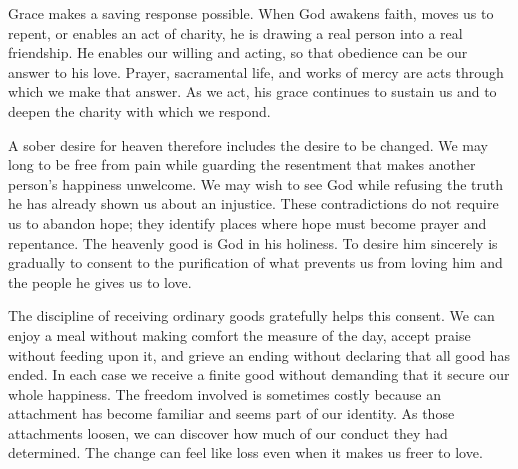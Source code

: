 Grace makes a saving response possible. When God awakens faith, moves us to repent, or enables an act of charity, he is drawing a real person into a real friendship. He enables our willing and acting, so that obedience can be our answer to his love. Prayer, sacramental life, and works of mercy are acts through which we make that answer. As we act, his grace continues to sustain us and to deepen the charity with which we respond.

A sober desire for heaven therefore includes the desire to be changed. We may long to be free from pain while guarding the resentment that makes another person's happiness unwelcome. We may wish to see God while refusing the truth he has already shown us about an injustice. These contradictions do not require us to abandon hope; they identify places where hope must become prayer and repentance. The heavenly good is God in his holiness. To desire him sincerely is gradually to consent to the purification of what prevents us from loving him and the people he gives us to love.

The discipline of receiving ordinary goods gratefully helps this consent. We can enjoy a meal without making comfort the measure of the day, accept praise without feeding upon it, and grieve an ending without declaring that all good has ended. In each case we receive a finite good without demanding that it secure our whole happiness. The freedom involved is sometimes costly because an attachment has become familiar and seems part of our identity. As those attachments loosen, we can discover how much of our conduct they had determined. The change can feel like loss even when it makes us freer to love.

